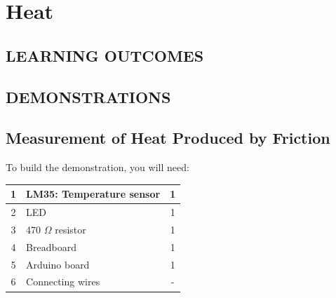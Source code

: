 \chapter{Heat}

\section*{LEARNING OUTCOMES}
{
\begin{center}
\end{center}
}

\section*{DEMONSTRATIONS}
\section*{Measurement of Heat Produced by Friction}

To build the demonstration, you will need:

\begin{table}[H]
    \centering
    \begin{tabular}{|c|l|c|}\hline
    1   &   LM35: Temperature sensor &   1\\\hline
    2   &   LED                     &   1\\\hline
    3   &   470 $\Omega$ resistor   &   1\\\hline
    4   &   Breadboard              &   1\\\hline
    5   &   Arduino board           &   1\\\hline
    6   &   Connecting wires        &   -\\\hline
    \end{tabular}
\end{table}

